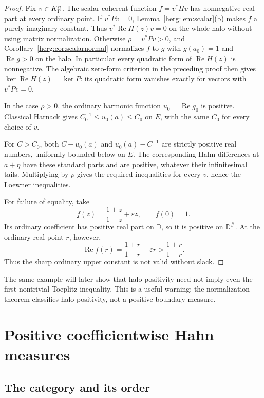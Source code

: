 \documentclass[11pt,letterpaper]{article}
\theoremstyle{definition}
\newcommand{\D}{\mathbb D}\newcommand{\No}{\mathbf{No}}
\newcommand{\Rea}{\operatorname{Re}}
\newcommand{\eps}{\varepsilon}
\newcommand{\halo}[1]{#1^{\#}}
\numberwithin{equation}{section}
\begin{document}
\begin{proof}
Fix $v\in K_\Gamma^n$. The scalar coherent function $f=v^*Hv$ has
nonnegative real part at every ordinary point. If $v^*Pv=0$,
Lemma~\ref{herg:lem:scalar}(b) makes $f$ a purely imaginary constant.
Thus $v^*\Rea H(z)v=0$ on the whole halo without using matrix normalization.
Otherwise $\rho=v^*Pv>0$, and Corollary~\ref{herg:cor:scalarnormal}
normalizes $f$ to $g$ with $g(a_0)=1$ and $\Rea g>0$ on the halo.
In particular every quadratic form of $\Rea H(z)$ is nonnegative.
The algebraic zero-form criterion in the preceding proof then gives
$\ker\Rea H(z)=\ker P$: its quadratic form vanishes exactly for vectors
with $v^*Pv=0$.

In the case $\rho>0$, the ordinary harmonic function $u_0=\Rea g_0$
is positive. Classical Harnack gives
$C_0^{-1}\le u_0(a)\le C_0$ on $E$, with the same $C_0$ for every
choice of $v$.

For $C>C_0$, both $C-u_0(a)$ and $u_0(a)-C^{-1}$ are strictly positive real numbers, uniformly bounded below on $E$. The corresponding Hahn differences at $a+\eta$ have these standard parts and are positive, whatever their infinitesimal tails. Multiplying by $\rho$ gives the required inequalities for every $v$, hence the Loewner inequalities.

For failure of equality, take
\begin{equation}\label{herg:eq:harnackfailure}
 f(z)=\frac{1+z}{1-z}+\eps z,\qquad f(0)=1.
\end{equation}
Its ordinary coefficient has positive real part on $\D$, so it is positive on $\halo\D$. At the ordinary real point $r$, however,
\[
 \Rea f(r)=\frac{1+r}{1-r}+\eps r>
 \frac{1+r}{1-r}.
\]
Thus the sharp ordinary upper constant is not valid without slack.
\end{proof}

The same example will later show that halo positivity need not imply even the first nontrivial Toeplitz inequality. This is a useful warning: the normalization theorem classifies halo positivity, not a positive boundary measure.

\section{Positive coefficientwise Hahn measures}
\label{herg:sec:measures}

\subsection{The category and its order}
\end{document}

